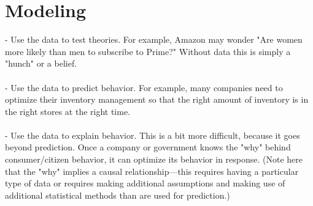\documentclass{article}
\begin{document}
\section{Modeling}
   - Use the data to test theories. For example, Amazon may wonder "Are women more likely than men to subscribe to Prime?" Without data this is simply a "hunch" or a belief.
\\
\\
    - Use the data to predict behavior. For example, many companies need to optimize their inventory management so that the right amount of inventory is in the right stores at the right time.
\\
\\
    - Use the data to explain behavior. This is a bit more difficult, because it goes beyond prediction. Once a company or government knows the "why" behind consumer/citizen behavior, it can optimize its behavior in response. (Note here that the "why" implies a causal relationship---this requires having a particular type of data or requires making additional assumptions and making use of additional statistical methods than are used for prediction.)
\end{document}
